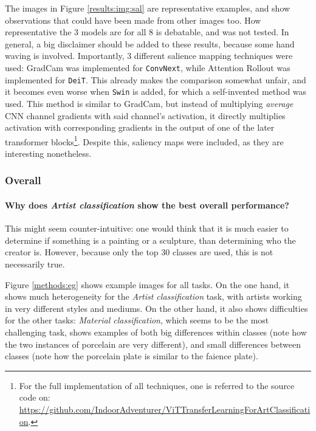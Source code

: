The images in Figure \ref{results:img:sal} are representative examples, and show observations that could have been made from other images too. How representative the 3 models are for all 8 is debatable, and was not tested. In general, a big disclaimer should be added to these results, because some hand waving is involved. Importantly, 3 different salience mapping techniques were used: GradCam \citep{selvaraju2017grad} was implemented for \texttt{ConvNext}, while Attention Rollout \citep{abnar2020quantifying} was implemented for \texttt{DeiT}. This already makes the comparison somewhat unfair, and it becomes even worse when \texttt{Swin} is added, for which a self-invented method was used. This method is similar to GradCam, but instead of multiplying \textit{average} CNN channel gradients with said channel's activation, it directly multiplies activation with corresponding gradients in the output of one of the later transformer blocks\footnote{For the full implementation of all techniques, one is referred to the source code on: \\ \url{https://github.com/IndoorAdventurer/ViTTransferLearningForArtClassification}.}. Despite this, saliency maps were included, as they are interesting nonetheless.

\subsubsection{Overall}

\paragraph{Why does \textit{Artist classification} show the best overall performance?}
This might seem counter-intuitive: one would think that it is much easier to determine if something is a painting or a sculpture, than determining who the creator is. However, because only the top 30 classes are used, this is not necessarily true.

Figure \ref{methods:eg} shows example images for all tasks. On the one hand, it shows much heterogeneity for the \textit{Artist classification} task, with artists working in very different styles and mediums. On the other hand, it also shows difficulties for the other tasks: \textit{Material classification}, which seems to be the most challenging task, shows examples of both big differences within classes (note how the two instances of porcelain are very different), and small differences between classes (note how the porcelain plate is similar to the faience plate).

